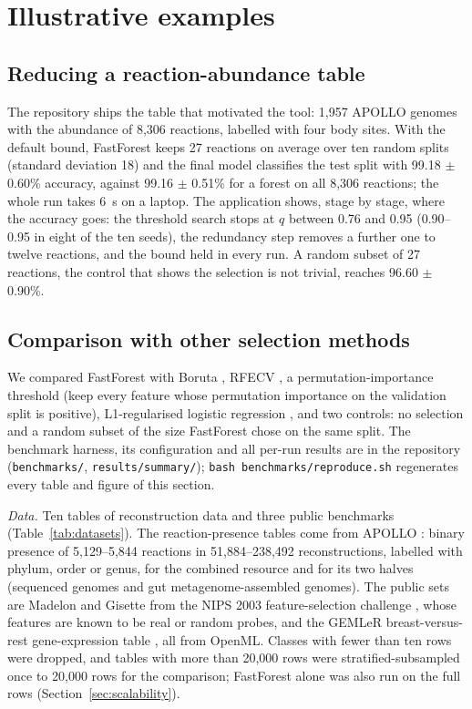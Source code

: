 \documentclass[11pt,a4paper]{article}
\begin{document}
\section{Illustrative examples}
\label{sec:examples}

\subsection{Reducing a reaction-abundance table}

The repository ships the table that motivated the tool: 1,957 APOLLO genomes with the abundance of 8,306 reactions, labelled with four body sites. With the default bound, FastForest keeps 27 reactions on average over ten random splits (standard deviation 18) and the final model classifies the test split with 99.18 $\pm$ 0.60\% accuracy, against 99.16 $\pm$ 0.51\% for a forest on all 8,306 reactions; the whole run takes 6~s on a laptop. The application shows, stage by stage, where the accuracy goes: the threshold search stops at $q$ between 0.76 and 0.95 (0.90--0.95 in eight of the ten seeds), the redundancy step removes a further one to twelve reactions, and the bound held in every run. A random subset of 27 reactions, the control that shows the selection is not trivial, reaches 96.60 $\pm$ 0.90\%.

\subsection{Comparison with other selection methods}

We compared FastForest with Boruta \cite{kursa2010}, RFECV \cite{guyon2002}, a permutation-importance threshold (keep every feature whose permutation importance on the validation split is positive), L1-regularised logistic regression \cite{tibshirani1996}, and two controls: no selection and a random subset of the size FastForest chose on the same split. The benchmark harness, its configuration and all per-run results are in the repository (\texttt{benchmarks/}, \texttt{results/summary/}); \texttt{bash benchmarks/reproduce.sh} regenerates every table and figure of this section.

\emph{Data.} Ten tables of reconstruction data and three public benchmarks (Table~\ref{tab:datasets}). The reaction-presence tables come from APOLLO \cite{heinken2025}: binary presence of 5,129--5,844 reactions in 51,884--238,492 reconstructions, labelled with phylum, order or genus, for the combined resource and for its two halves (sequenced genomes and gut metagenome-assembled genomes). The public sets are Madelon and Gisette from the NIPS 2003 feature-selection challenge \cite{guyon2004}, whose features are known to be real or random probes, and the GEMLeR breast-versus-rest gene-expression table \cite{stiglic2010}, all from OpenML. Classes with fewer than ten rows were dropped, and tables with more than 20,000 rows were stratified-subsampled once to 20,000 rows for the comparison; FastForest alone was also run on the full rows (Section~\ref{sec:scalability}).
\end{document}

